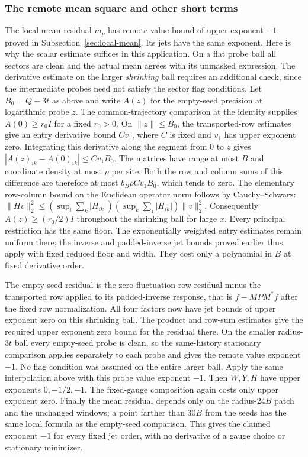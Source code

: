 \subsubsection{The remote mean square and other short terms}
The local mean residual $m_p$ has remote value bound of upper
exponent $-1$, proved in Subsection~\ref{sec:local-mean}. Its jets
have the same exponent. Here is why the scalar estimate suffices
in this application. On a flat probe ball all sectors are clean
and the actual mean agrees with its unmasked expression. The
derivative estimate on the larger \emph{shrinking} ball requires
an additional check, since the intermediate probes need not satisfy
the sector flag conditions. Let $B_0=Q+3t$ as above and write
$A(z)$ for the empty-seed precision at logarithmic probe $z$.
The common-trajectory comparison at the identity supplies
$A(0)\ge r_0 I$ for a fixed $r_0>0$. On $\|z\|\le B_0$,
the transported-row estimates give an entry derivative bound
$C v_1$, where $C$ is fixed and $v_1$ has upper exponent zero.
Integrating this derivative along the segment from $0$ to $z$
gives $|A(z)_{ik}-A(0)_{ik}|\le C v_1B_0$. The matrices have
range at most $B$ and coordinate density at most $\rho$ per site.
Both the row and column sums of this difference are therefore
at most $b_B\rho C v_1B_0$, which tends to zero. The elementary
row-column bound on the Euclidean operator norm follows by
Cauchy--Schwarz:
$\|Hv\|_2^2\le(\sup_i\sum_k|H_{ik}|)
(\sup_k\sum_i|H_{ik}|)\|v\|_2^2$.
Consequently $A(z)\ge(r_0/2)I$ throughout the shrinking ball
for large $x$. Every principal restriction has the same floor.
The exponentially weighted entry estimates remain uniform there;
the inverse and padded-inverse jet bounds proved earlier thus
apply with fixed reduced floor and width. They cost only a
polynomial in $B$ at fixed derivative order.

The empty-seed residual is the zero-fluctuation row residual
minus the transported row applied to its padded-inverse response,
that is $f-MPM^*f$ after the fixed row normalization. All four
factors now have jet bounds of upper exponent zero on this
shrinking ball. The product and row-sum estimates give the required
upper exponent zero bound for the residual there. On the smaller
radius-$3t$ ball every empty-seed probe is clean, so the
same-history stationary comparison applies separately to each
probe and gives the remote value exponent $-1$. No flag condition
was assumed on the entire larger ball. Apply the same interpolation
above with this probe value exponent $-1$.
Then $W,Y,H$ have upper exponents $0,-1/2,-1$. The fixed-gauge
composition again costs only upper exponent zero. Finally the
mean residual depends only on the radius-$24B$ patch and the
unchanged windows; a point farther than $30B$ from the seeds has
the same local formula as the empty-seed comparison. This gives
the claimed exponent $-1$ for every fixed jet order, with no
derivative of a gauge choice or stationary minimizer.

